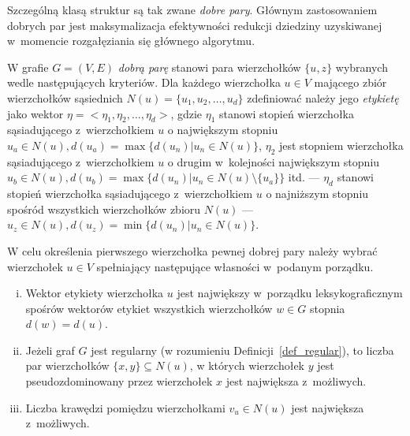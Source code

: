 \par{
  Szczególną klasą struktur są tak zwane \emph{dobre pary}.
  Głównym zastosowaniem dobrych par jest maksymalizacja efektywności redukcji dziedziny uzyskiwanej w~momencie rozgałęziania się głównego algorytmu.
  \begin{definition}
    W grafie $G=(V, E)$ \emph{dobrą parę} stanowi para wierzchołków $\{u, z\}$ wybranych wedle następujących kryteriów.
    Dla każdego wierzchołka $u \in V$ mającego zbiór wierzchołków sąsiednich $N(u)=\{u_1, u_2, \ldots, u_d\}$ zdefiniować należy jego \emph{etykietę} jako wektor $\eta=<\eta_1, \eta_2, \ldots, \eta_d>$, gdzie $\eta_1$ stanowi stopień wierzchołka sąsiadującego z~wierzchołkiem $u$ o największym stopniu $u_{a} \in N(u), d(u_{a})=\max\{d(u_n) | u_n \in N(u)\}$, $\eta_2$ jest stopniem wierzchołka sąsiadującego z~wierzchołkiem $u$ o drugim w~kolejności największym stopniu $u_{b} \in N(u), d(u_{b})=\max\{d(u_n) | u_n \in N(u) \setminus \{u_{a}\}\}$ itd. --- $\eta_d$ stanowi stopień wierzchołka sąsiadującego z~wierzchołkiem $u$ o najniższym stopniu spośród wszystkich wierzchołków zbioru $N(u)$ --- $u_{z} \in N(u), d(u_{z})=\min\{d(u_n) | u_n \in N(u)\}$.

    W celu określenia pierwszego wierzchołka pewnej dobrej pary należy wybrać wierzchołek $u \in V$ spełniający następujące własności w~podanym porządku.
    \begin{enumerate}[(i)]
      \item Wektor etykiety wierzchołka $u$ jest największy w~porządku leksykograficznym spośrów wektorów etykiet wszystkich wierzchołków $w \in G$ stopnia $d(w)=d(u)$.
      \item  Jeżeli graf $G$ jest regularny (w rozumieniu Definicji~\ref{def_regular}), to liczba par wierzchołków $\{x, y\} \subseteq N(u)$, w których wierzchołek $y$ jest pseudozdominowany przez wierzchołek $x$ jest największa z~możliwych.
      \item Liczba krawędzi pomiędzu wierzchołkami $v_u \in N(u)$ jest największa z~możliwych.
    \end{enumerate}


\end{definition}}
